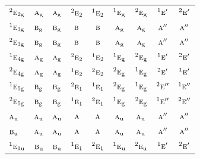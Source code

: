 \documentclass[10pt,a4paper]{article}
\numberwithin{equation}{section}
\newcommand{\irr}[1]{\text{\normalfont\scshape #1}}
\newcommand{\conjpair}[1]{{}^{#1}}
\newcommand{\ptag}[1]{\mathrm{#1}}
\begin{document}
{\begin{longtable}{@{}lcccccccc@{}}
$\conjpair{2}\irr{e}_{2\ptag{g}}$ & $\irr{a}_{\ptag{g}}$ & $\irr{a}_{\ptag{g}}$ & $\conjpair{2}\irr{e}_{2}$ & $\conjpair{1}\irr{e}_{2}$ & $\conjpair{1}\irr{e}_{\ptag{g}}$ & $\conjpair{2}\irr{e}_{\ptag{g}}$ & $\conjpair{1}\irr{e}'$ & $\conjpair{2}\irr{e}'$\\
$\conjpair{1}\irr{e}_{3\ptag{g}}$ & $\irr{b}_{\ptag{g}}$ & $\irr{b}_{\ptag{g}}$ & $\irr{b}$ & $\irr{b}$ & $\irr{a}_{\ptag{g}}$ & $\irr{a}_{\ptag{g}}$ & $\irr{a}''$ & $\irr{a}''$\\
$\conjpair{2}\irr{e}_{3\ptag{g}}$ & $\irr{b}_{\ptag{g}}$ & $\irr{b}_{\ptag{g}}$ & $\irr{b}$ & $\irr{b}$ & $\irr{a}_{\ptag{g}}$ & $\irr{a}_{\ptag{g}}$ & $\irr{a}''$ & $\irr{a}''$\\
$\conjpair{1}\irr{e}_{4\ptag{g}}$ & $\irr{a}_{\ptag{g}}$ & $\irr{a}_{\ptag{g}}$ & $\conjpair{2}\irr{e}_{2}$ & $\conjpair{1}\irr{e}_{2}$ & $\conjpair{1}\irr{e}_{\ptag{g}}$ & $\conjpair{2}\irr{e}_{\ptag{g}}$ & $\conjpair{1}\irr{e}'$ & $\conjpair{2}\irr{e}'$\\
$\conjpair{2}\irr{e}_{4\ptag{g}}$ & $\irr{a}_{\ptag{g}}$ & $\irr{a}_{\ptag{g}}$ & $\conjpair{1}\irr{e}_{2}$ & $\conjpair{2}\irr{e}_{2}$ & $\conjpair{2}\irr{e}_{\ptag{g}}$ & $\conjpair{1}\irr{e}_{\ptag{g}}$ & $\conjpair{2}\irr{e}'$ & $\conjpair{1}\irr{e}'$\\
$\conjpair{1}\irr{e}_{5\ptag{g}}$ & $\irr{b}_{\ptag{g}}$ & $\irr{b}_{\ptag{g}}$ & $\conjpair{2}\irr{e}_{1}$ & $\conjpair{1}\irr{e}_{1}$ & $\conjpair{2}\irr{e}_{\ptag{g}}$ & $\conjpair{1}\irr{e}_{\ptag{g}}$ & $\conjpair{2}\irr{e}''$ & $\conjpair{1}\irr{e}''$\\
$\conjpair{2}\irr{e}_{5\ptag{g}}$ & $\irr{b}_{\ptag{g}}$ & $\irr{b}_{\ptag{g}}$ & $\conjpair{1}\irr{e}_{1}$ & $\conjpair{2}\irr{e}_{1}$ & $\conjpair{1}\irr{e}_{\ptag{g}}$ & $\conjpair{2}\irr{e}_{\ptag{g}}$ & $\conjpair{1}\irr{e}''$ & $\conjpair{2}\irr{e}''$\\
$\irr{a}_{\ptag{u}}$ & $\irr{a}_{\ptag{u}}$ & $\irr{a}_{\ptag{u}}$ & $\irr{a}$ & $\irr{a}$ & $\irr{a}_{\ptag{u}}$ & $\irr{a}_{\ptag{u}}$ & $\irr{a}''$ & $\irr{a}''$\\
$\irr{b}_{\ptag{u}}$ & $\irr{a}_{\ptag{u}}$ & $\irr{a}_{\ptag{u}}$ & $\irr{a}$ & $\irr{a}$ & $\irr{a}_{\ptag{u}}$ & $\irr{a}_{\ptag{u}}$ & $\irr{a}''$ & $\irr{a}''$\\
$\conjpair{1}\irr{e}_{1\ptag{u}}$ & $\irr{b}_{\ptag{u}}$ & $\irr{b}_{\ptag{u}}$ & $\conjpair{1}\irr{e}_{1}$ & $\conjpair{2}\irr{e}_{1}$ & $\conjpair{1}\irr{e}_{\ptag{u}}$ & $\conjpair{2}\irr{e}_{\ptag{u}}$ & $\conjpair{1}\irr{e}'$ & $\conjpair{2}\irr{e}'$\\

\end{longtable}}
\end{document}
